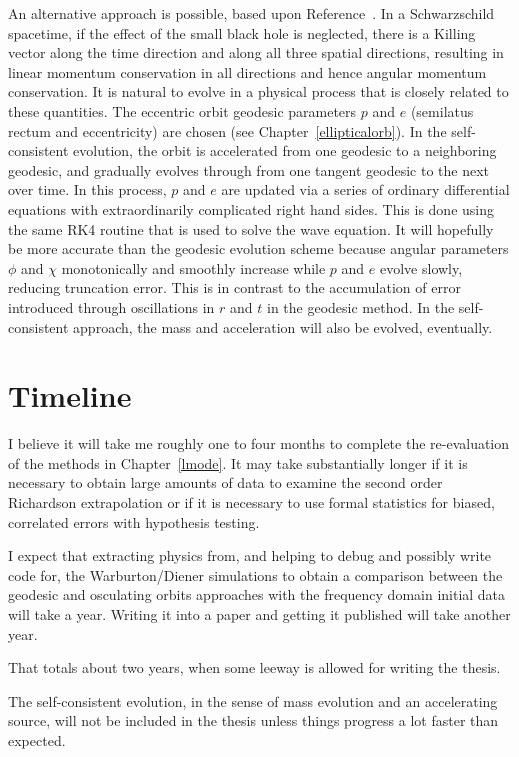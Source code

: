 An alternative approach is possible, based upon Reference~\cite{pound_poisson}. In a Schwarzschild spacetime, if the effect of the small black hole is neglected, there is a Killing vector along the time direction and along all three spatial directions, resulting in linear momentum conservation in all directions and hence angular momentum conservation. It is natural to evolve in a physical process that is closely related to these quantities. The eccentric orbit geodesic parameters $p$ and $e$ (semilatus rectum and eccentricity) are chosen (see Chapter~\ref{ellipticalorb}). In the self-consistent evolution, the orbit is accelerated from one geodesic to a neighboring geodesic, and gradually evolves through from one tangent geodesic to the next over time. In this process, $p$ and $e$ are updated via a series of ordinary differential equations with extraordinarily complicated right hand sides. This is done using the same RK4 routine that is used to solve the wave equation. It will hopefully be more accurate than the geodesic evolution scheme because angular parameters $\phi$ and $\chi$ monotonically and smoothly increase while $p$ and $e$ evolve slowly, reducing truncation error. This is in contrast to the accumulation of error introduced through oscillations in $r$ and $t$ in the geodesic method. In the self-consistent approach, the mass and acceleration will also be evolved, eventually. 



\section{Timeline}

I believe it will take me roughly one to four months to complete the re-evaluation of the methods in Chapter~\ref{lmode}. It may take substantially longer if it is necessary to obtain large amounts of data to examine the second order Richardson extrapolation or if it is necessary to use formal statistics for biased, correlated errors with hypothesis testing.

I expect that extracting physics from, and helping to debug and possibly write code for, the Warburton/Diener simulations to obtain a comparison between the geodesic and osculating orbits approaches with the frequency domain initial data will take a year. Writing it into a paper and getting it published will take another year.

That totals about two years, when some leeway is allowed for writing the thesis. 

The self-consistent evolution, in the sense of mass evolution and an accelerating source, will not be included in the thesis unless things progress a lot faster than expected. 


